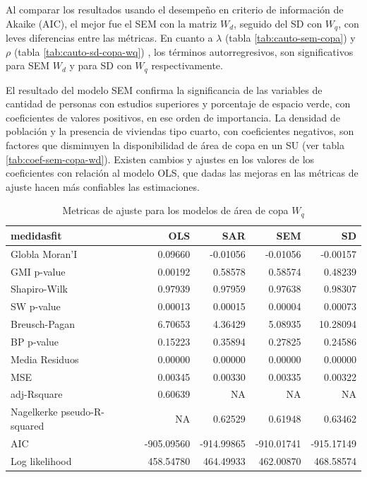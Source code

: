 \documentclass[12pt,a4paper,oneside, openany]{book}
\theoremstyle{definition}
\theoremstyle{definition}
\theoremstyle{definition}
\theoremstyle{remark}
\begin{document}
Al comparar los resultados usando el desempeño en criterio de
información de Akaike (AIC), el mejor fue el SEM con la matriz \(W_d\),
seguido del SD con \(W_q\), con leves diferencias entre las métricas. En
cuanto a \(\lambda\) (tabla \ref{tab:cauto-sem-copa}) y \(\rho\) (tabla
\ref{tab:cauto-sd-copa-wq}) , los términos autorregresivos, son
significativos para SEM \(W_d\) y para SD con \(W_q\) respectivamente.

El resultado del modelo SEM confirma la significancia de las variables
de cantidad de personas con estudios superiores y porcentaje de espacio
verde, con coeficientes de valores positivos, en ese orden de
importancia. La densidad de población y la presencia de viviendas tipo
cuarto, con coeficientes negativos, son factores que disminuyen la
disponibilidad de área de copa en un SU (ver tabla
\ref{tab:coef-sem-copa-wd}). Existen cambios y ajustes en los valores de
los coeficientes con relación al modelo OLS, que dadas las mejoras en
las métricas de ajuste hacen más confiables las estimaciones.

\begin{table}[H]

\caption{\label{tab:tabla-comp-modelos-copa-wq}Metricas de ajuste para los modelos de área de copa $W_q$}
\centering
\begin{tabular}{lrrrr}
\toprule
medidasfit & OLS & SAR & SEM & SD\\
\midrule
Globla Moran'I & 0.09660 & -0.01056 & -0.01056 & -0.00157\\
GMI p-value & 0.00192 & 0.58578 & 0.58574 & 0.48239\\
Shapiro-Wilk & 0.97939 & 0.97959 & 0.97638 & 0.98307\\
SW p-value & 0.00013 & 0.00015 & 0.00004 & 0.00073\\
Breusch-Pagan & 6.70653 & 4.36429 & 5.08935 & 10.28094\\
\addlinespace
BP p-value & 0.15223 & 0.35894 & 0.27825 & 0.24586\\
Media Residuos & 0.00000 & 0.00000 & 0.00000 & 0.00000\\
MSE & 0.00345 & 0.00330 & 0.00335 & 0.00322\\
adj-Rsquare & 0.60639 & NA & NA & NA\\
Nagelkerke pseudo-R-squared & NA & 0.62529 & 0.61948 & 0.63462\\
\addlinespace
AIC & -905.09560 & -914.99865 & -910.01741 & -915.17149\\
Log likelihood & 458.54780 & 464.49933 & 462.00870 & 468.58574\\
\bottomrule
\end{tabular}
\end{table}
\end{document}
